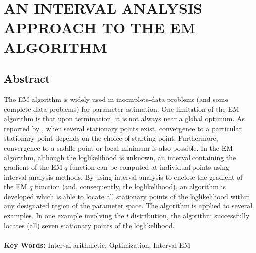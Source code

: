 
\def\bfw{ {\bf w}}
\def\bfx{{\bf x}}
\def\bfy{{\bf y}}
\def\bfOmega{\mbox{\boldmath $\Omega$}}
\def\bfphi{\mbox{\boldmath $\phi$}}
\def\bfPhi{\mbox{\boldmath $\Phi$}}
\def\bfpi{\mbox{\boldmath $\pi$}}
\def\bfmu{\mbox{\boldmath $\mu$}}
\def\bfPhi{\mbox{\boldmath $\Phi$}}

\chapter{AN INTERVAL ANALYSIS APPROACH TO THE EM ALGORITHM}

\section*{Abstract}
The EM algorithm is widely used in incomplete-data problems (and some
complete-data problems) for parameter estimation.   One limitation of the EM
algorithm is that upon termination, it is not always near a global optimum.
As reported by \cite{WuEM}, when several stationary points exist, 
convergence to a particular stationary point depends on the
choice of starting point.  Furthermore, convergence to a saddle point or local
minimum is also possible.  In the EM algorithm, although the
loglikelihood is unknown, an interval containing 
the gradient of the EM $q$ function can be computed at
individual points using interval analysis methods.  
By using interval analysis to enclose the gradient of the
EM $q$ function (and, consequently, the loglikelihood), an algorithm is
developed which is able to locate all stationary points of the loglikelihood 
within any designated region of the parameter space.  The algorithm is applied
to several examples.  In one example involving the $t$ distribution, the
algorithm successfully locates (all) seven stationary points of the
loglikelihood.\\
\\
{\bf Key Words: } Interval arithmetic, Optimization, Interval EM




